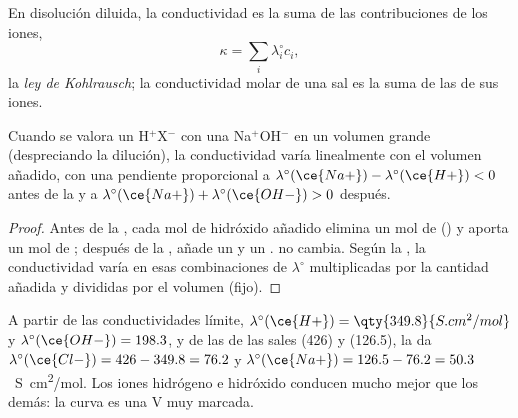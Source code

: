 \begin{proposition}\label{prop:b1:titration-methods:kohlrausch}
En disolución diluida, la conductividad es la suma de las contribuciones
de los iones,
\[
  \kappa = \sum_i \lambda_i^\circ c_i ,
\]
la \emph{ley de Kohlrausch}; la conductividad
molar de una sal es la suma de las de sus iones.
\end{proposition}


\begin{proposition}\label{prop:b1:titration-methods:conductimetric-slopes}
Cuando se valora un  H$^+$X$^-$ con una 
Na$^+$OH$^-$ en un volumen grande (despreciando la dilución), la
conductividad varía linealmente con el volumen añadido, con una
pendiente proporcional a
$\lambda^\circ(\ce{Na+}) - \lambda^\circ(\ce{H+}) < 0$ antes de la
 y a $\lambda^\circ(\ce{Na+}) + \lambda^\circ(\ce{OH-}) > 0$
después.
\end{proposition}

\begin{proof}
Antes de la , cada mol de hidróxido añadido elimina un mol de
 () y aporta un mol de ; después de la
, añade un  y un .  no cambia. Según la
, la conductividad varía en esas combinaciones de
$\lambda^\circ$ multiplicadas por la cantidad añadida y divididas por el
volumen (fijo).
\end{proof}

A partir de las conductividades límite, $\lambda^\circ(\ce{H+}) =
\qty{349.8}{S.cm^2/mol}$ y $\lambda^\circ(\ce{OH-}) = 198.3$, y de las de
las sales  (426) y  (126.5), la  da
$\lambda^\circ(\ce{Cl-}) = 426 - 349.8 = 76.2$ y $\lambda^\circ(\ce{Na+}) =
126.5 - 76.2 = 50.3$~\unit{S.cm^2/mol}. Los iones hidrógeno e hidróxido
conducen mucho mejor que los demás: la curva es una V muy marcada.

